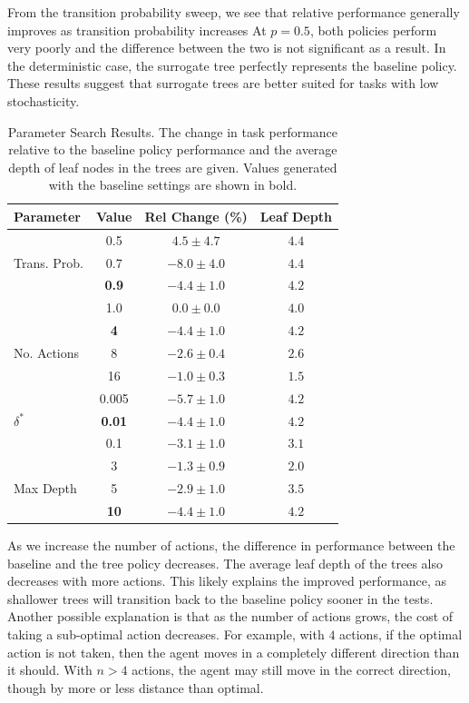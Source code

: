 \documentclass[letterpaper]{article} %
\begin{document}
From the transition probability sweep, we see that relative performance generally improves as transition probability increases
At $p=0.5$, both policies perform very poorly and the difference between the two is not significant as a result.
In the deterministic case, the surrogate tree perfectly represents the baseline policy.
These results suggest that surrogate trees are better suited for tasks with low stochasticity.
\begin{table}[t]
\centering
\begin{tabular}{@{}l c c c@{}}
\toprule
Parameter & Value & Rel Change (\%) & Leaf Depth \\
\midrule
\multirow[c]{3}{*}{Trans. Prob.} & 0.5 & $4.5 \pm 4.7$ & $4.4$ \\
& 0.7 & $-8.0 \pm 4.0$ & $4.4$ \\
& \textbf{0.9} & $\mathbf{-4.4 \pm 1.0}$ & $\mathbf{4.2}$ \\
& 1.0 & $0.0 \pm 0.0$ & $4.0$ \\
\midrule
\multirow[c]{3}{*}{No. Actions} & \textbf{4} & $\mathbf{-4.4 \pm 1.0}$ & $\mathbf{4.2}$ \\
& 8 & $-2.6 \pm 0.4$ & $2.6$ \\
& 16 & $-1.0 \pm 0.3$ & $1.5$ \\
\midrule
\multirow[c]{3}{*}{$\delta^*$} & 0.005 & $-5.7 \pm 1.0$ & $4.2$ \\
& \textbf{0.01} & $\mathbf{-4.4 \pm 1.0}$ & $\mathbf{4.2}$ \\
& 0.1 & $-3.1 \pm 1.0$ & $3.1$ \\
\midrule
\multirow[c]{3}{*}{Max Depth} & 3 & $-1.3 \pm 0.9$ & $2.0$ \\
& 5 & $-2.9 \pm 1.0$ & $3.5$ \\
& \textbf{10} & $\mathbf{-4.4 \pm 1.0}$ & $\mathbf{4.2}$ \\
\bottomrule
\end{tabular}
\caption{Parameter Search Results. The change in task performance relative to the baseline policy performance and the average depth of leaf nodes in the trees are given. Values generated with the baseline settings are shown in bold.}
\label{tab: grid results}
\end{table}

As we increase the number of actions, the difference in performance between the baseline and the tree policy decreases.
The average leaf depth of the trees also decreases with more actions.
This likely explains the improved performance, as shallower trees will transition back to the baseline policy sooner in the tests.
Another possible explanation is that as the number of actions grows, the cost of taking a sub-optimal action decreases.
For example, with $4$ actions, if the optimal action is not taken, then the agent moves in a completely different direction than it should.
With $n>4$ actions, the agent may still move in the correct direction, though by more or less distance than optimal.
\end{document}
